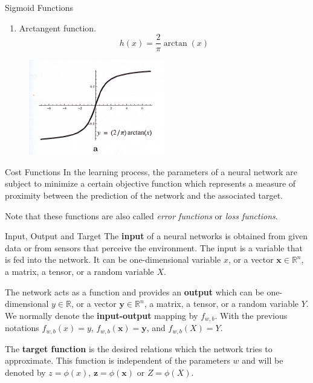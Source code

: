 \documentclass{beamer}
\begin{document}
\begin{frame}{Sigmoid Functions}
	\begin{enumerate}
		\item Arctangent function.  
		\begin{equation*}
			h(x)=\frac{2}{\pi}\arctan(x)
		\end{equation*}
	\end{enumerate}

	\begin{figure}[h]
	\centering
	\includegraphics[scale=0.8]{../../Figures/fig_activation_29a}
\end{figure}
\end{frame}

\begin{frame}{Cost Functions}
	In the learning process, the parameters of a neural network are subject to minimize a certain objective function which represents a measure of proximity between the prediction of the network and the associated target.
	
	Note that these functions are also called \textit{error functions} or \textit{loss functions}. 
\end{frame}

\begin{frame}{Input, Output and Target}
	The \textbf{input} of a neural networks is obtained from given data or from sensors that perceive the environment. The input is a variable that is fed into the network. It can be one-dimensional variable $x$, or a vector $\textbf{x} \in \mathbb{R}^n$, a matrix, a tensor, or a random variable $X$. 
	
	The network acts as a function and provides an \textbf{output} which can be one-dimensional $y \in \mathbb{R}$, or a vector $\textbf{y} \in \mathbb{R}^n$, a matrix, a tensor, or a random variable $Y$. We normally denote the \textbf{input-output} mapping by $f_{w,b}$. With the previous notations $f_{w,b}(x)=y$, $f_{w,b}(\textbf{x})= \textbf{y}$, and $f_{w,b}(X)=Y$.
	
	The \textbf{target function} is the desired relations which the network tries to approximate. This function is independent of the parameters $w$ and will be denoted by $z=\phi(x)$, $\textbf{z}=\phi(\textbf{x})$ or $Z=\phi(X)$.  
	 
	
\end{frame}
\end{document}
